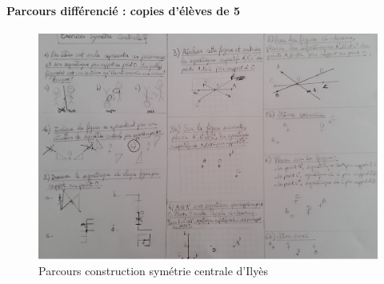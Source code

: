 \paragraph{Parcours différencié : copies d'élèves de 5 \\}
\begin{figure}[!h]
	\centering
	\includegraphics[scale=0.5]{img/symetrie_Ilyes.jpg}
	\caption{Parcours construction symétrie centrale d'Ilyès}
\end{figure}
